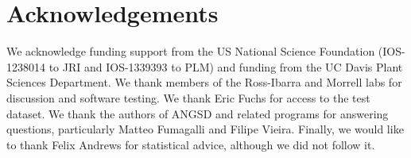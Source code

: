 \documentclass[10pt,a4paper]{article}
\begin{document}
\section*{Acknowledgements}
We acknowledge funding support from the US National Science Foundation (IOS-1238014 to JRI and IOS-1339393 to PLM) and funding from the UC Davis Plant Sciences Department.  We thank members of the Ross-Ibarra and Morrell labs for discussion and software testing. We thank Eric Fuchs for access to the test dataset. We thank the authors of ANGSD and related programs for answering questions, particularly Matteo Fumagalli and Filipe Vieira. Finally, we would like to thank Felix Andrews for statistical advice, although we did not follow it. 





\end{document}
